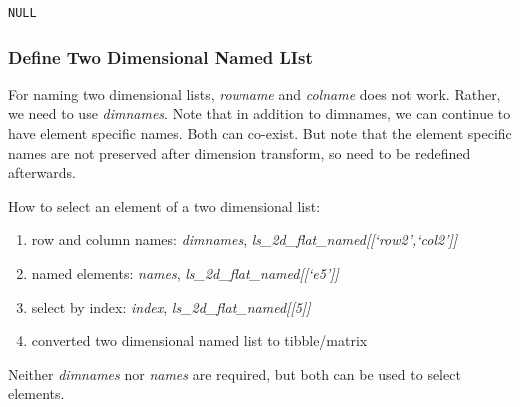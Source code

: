 \documentclass[
]{book}
\providecommand{\tightlist}{%
  \setlength{\itemsep}{0pt}\setlength{\parskip}{0pt}}
\begin{document}
\begin{verbatim}
NULL
\end{verbatim}

\hypertarget{define-two-dimensional-named-list}{%
\subsubsection{Define Two Dimensional Named LIst}\label{define-two-dimensional-named-list}}

For naming two dimensional lists, \emph{rowname} and \emph{colname} does not work. Rather, we need to use \emph{dimnames}. Note that in addition to dimnames, we can continue to have element specific names. Both can co-exist. But note that the element specific names are not preserved after dimension transform, so need to be redefined afterwards.

How to select an element of a two dimensional list:

\begin{enumerate}
\def\labelenumi{\arabic{enumi}.}
\tightlist
\item
  row and column names: \emph{dimnames}, \emph{ls\_2d\_flat\_named{[}{[}`row2',`col2'{]}{]}}
\item
  named elements: \emph{names}, \emph{ls\_2d\_flat\_named{[}{[}`e5'{]}{]}}
\item
  select by index: \emph{index}, \emph{ls\_2d\_flat\_named{[}{[}5{]}{]}}
\item
  converted two dimensional named list to tibble/matrix
\end{enumerate}

Neither \emph{dimnames} nor \emph{names} are required, but both can be used to select elements.
\end{document}

